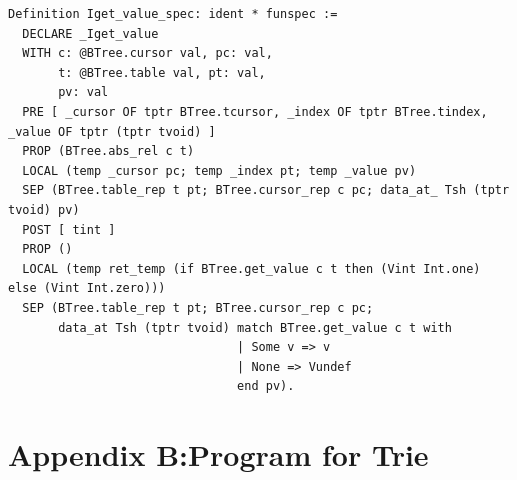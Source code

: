 \documentclass[runningheads]{llncs}
\begin{document}
\begin{verbatim}
Definition Iget_value_spec: ident * funspec :=
  DECLARE _Iget_value
  WITH c: @BTree.cursor val, pc: val,
       t: @BTree.table val, pt: val,
       pv: val
  PRE [ _cursor OF tptr BTree.tcursor, _index OF tptr BTree.tindex, _value OF tptr (tptr tvoid) ]
  PROP (BTree.abs_rel c t)
  LOCAL (temp _cursor pc; temp _index pt; temp _value pv)
  SEP (BTree.table_rep t pt; BTree.cursor_rep c pc; data_at_ Tsh (tptr tvoid) pv)
  POST [ tint ]
  PROP ()
  LOCAL (temp ret_temp (if BTree.get_value c t then (Vint Int.one) else (Vint Int.zero)))
  SEP (BTree.table_rep t pt; BTree.cursor_rep c pc;
       data_at Tsh (tptr tvoid) match BTree.get_value c t with
                                | Some v => v
                                | None => Vundef
                                end pv).
\end{verbatim}

\section*{Appendix B:\@Functional Program for Trie}
\end{document}
